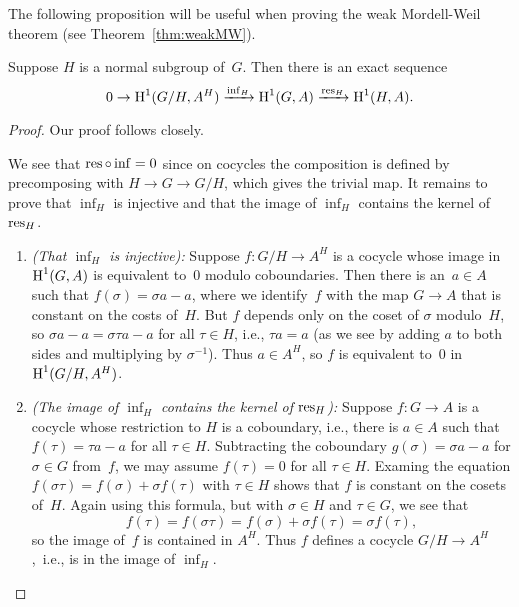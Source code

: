 The following proposition will be useful when proving
the weak Mordell-Weil theorem (see Theorem~\ref{thm:weakMW}).
\begin{proposition}\label{prop:infres}
	Suppose $H$ is a normal subgroup of~$G$.
	Then there is an exact sequence
	$$
		0 \to \operatorname{H}^1(G/H, A^H)\xrightarrow{\operatorname{inf}_H}  \operatorname{H}^1(G,A)\xrightarrow{\operatorname{res}_H} \operatorname{H}^1(H,A).
	$$
\end{proposition}
\begin{proof}
Our proof follows \cite[Pg.~117]{serre:localfields} closely.

We see that $\operatorname{res}\circ \operatorname{inf} = 0$ since on cocycles the composition is
defined by precomposing with $H\to G\to G/H$, which gives the trivial map.
It remains to prove that $\inf_H$ is injective and that the image of $\inf_H$
contains the kernel of $\operatorname{res}_H$.
\begin{enumerate}
\item {\em (That $\inf_H$ is injective):}
	Suppose $f:G/H\to A^H$ is a cocycle whose image in $\operatorname{H}^1(G,A)$
	is equivalent to~$0$ modulo coboundaries. Then there is an~$a\in A$
	such that $f(\sigma) = \sigma a - a$, where we identify~$f$ with
	the map $G\to A$ that is constant on the costs of~$H$. But $f$
	depends only on the coset of $\sigma$ modulo~$H$, so
	$\sigma a - a = \sigma \tau a - a$ for all $\tau \in H$, i.e.,
	$\tau a = a$ (as we see by adding $a$ to both sides and multiplying
	by $\sigma^{-1}$). Thus $a\in A^H$, so $f$ is equivalent to~$0$ in
	$\operatorname{H}^1(G/H,A^H)$.

\item {\em (The image of $\inf_H$ contains the kernel of $\operatorname{res}_H$):}
	Suppose $f:G\to A$ is a cocycle whose
	restriction to $H$ is a coboundary, i.e., there is $a\in A$ such
	that $f(\tau) = \tau a - a$ for all $\tau \in H$.
	Subtracting the coboundary $g(\sigma) = \sigma a - a$ for $\sigma\in G$
	from~$f$, we may assume $f(\tau) = 0$ for all $\tau \in H$.
	Examing the equation $f(\sigma\tau) = f(\sigma) + \sigma f(\tau)$
	with $\tau\in H$ shows that $f$ is constant on the cosets of~$H$.
	Again using this formula, but with $\sigma\in H$ and $\tau\in G$, we see
	that
	$$
	  f(\tau) = f(\sigma \tau) = f(\sigma) + \sigma f(\tau) = \sigma f(\tau),
	$$
	so the image of~$f$ is contained in $A^H$.  Thus $f$ defines a cocycle
	$G/H \to A^H$,~i.e., is in the image of $\inf_H$.
\end{enumerate}
\end{proof}

